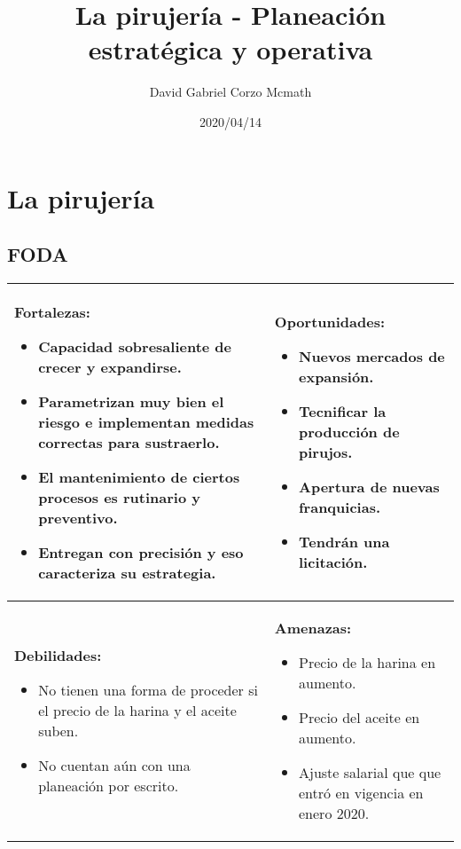 \documentclass{article}
\title{La pirujería - Planeación estratégica y operativa}
\date{2020/04/14}
\author{David Gabriel Corzo Mcmath}
\begin{document}
\maketitle
\section{La pirujería}
\subsection{FODA}
\begin{center}
   \begin{tabular}{ | p{8.25cm} | p{8.25cm} | }
        \hline
            \textbf{Fortalezas: } 
            \begin{itemize}
                \item Capacidad sobresaliente de crecer y expandirse.
                \item Parametrizan muy bien el riesgo e implementan medidas correctas para sustraerlo.
                \item El mantenimiento de ciertos procesos es rutinario y preventivo.
                \item Entregan con precisión y eso caracteriza su estrategia.
            \end{itemize}
            &
            \textbf{Oportunidades: } 
            \begin{itemize}
                \item Nuevos mercados de expansión.
                \item Tecnificar la producción de pirujos.
                \item Apertura de nuevas franquicias.
                \item Tendrán una licitación.
            \end{itemize}
            \\ 
        \hline
            \textbf{Debilidades: } 
            \begin{itemize}
                \item No tienen una forma de proceder si el precio de la harina y el aceite suben.
                \item No cuentan aún con una planeación por escrito.
            \end{itemize}
            &
            \textbf{Amenazas: } 
            \begin{itemize}
                \item Precio de la harina en aumento.
                \item Precio del aceite en aumento.
                \item Ajuste salarial que que entró en vigencia en enero 2020. 
            \end{itemize}
            \\ 
        \hline
   \end{tabular}
\end{center}
\end{document}
